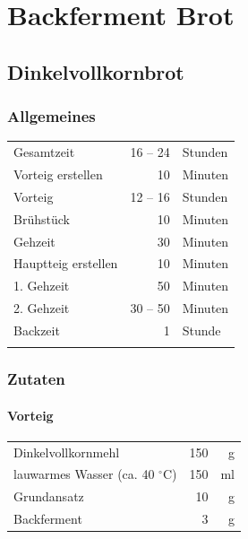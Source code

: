\chapter{Backferment Brot}
\section{Dinkelvollkornbrot} 
\subsection*{Allgemeines}

\begin{tabular}{lrl}
    Gesamtzeit          & 16 --  24 & Stunden           \\
    Vorteig erstellen   &        10 & Minuten           \\
    Vorteig             &  12 -- 16 & Stunden           \\
    Brühstück           &        10 & Minuten           \\
    Gehzeit             &        30 & Minuten           \\
    Hauptteig erstellen &        10 & Minuten           \\
    1. Gehzeit          &        50 & Minuten           \\
    2. Gehzeit          &  30 -- 50 & Minuten           \\
    Backzeit            &         1 & Stunde \\ 
    && \cite[Seite 159 ]{Pokorny2016}
\end{tabular} 

\subsection*{Zutaten}

\subsubsection*{Vorteig}
\begin{tabular}{lrr}
    Dinkelvollkornmehl                  & 150 &  g \\
    lauwarmes Wasser (ca. 40 $^\circ$C) & 150 & ml \\
    Grundansatz                         &  10 &  g \\
    Backferment                         &   3 &  g
\end{tabular} 

